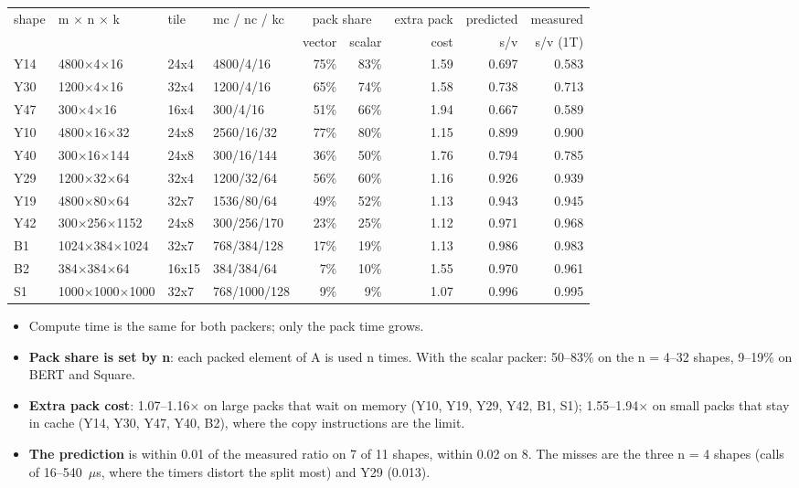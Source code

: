 \begin{center}\small
\begin{tabular}{@{}l l l l rr r rr@{}}
\toprule
shape & m $\times$ n $\times$ k & tile & mc / nc / kc & \multicolumn{2}{c}{pack share} & extra pack & predicted & measured \\
 & & & & vector & scalar & cost & s/v & s/v (1T) \\
\midrule
Y14 & 4800$\times$4$\times$16 & 24x4 & 4800/4/16 & 75\% & 83\% & 1.59 & 0.697 & 0.583 \\
Y30 & 1200$\times$4$\times$16 & 32x4 & 1200/4/16 & 65\% & 74\% & 1.58 & 0.738 & 0.713 \\
Y47 & 300$\times$4$\times$16 & 16x4 & 300/4/16 & 51\% & 66\% & 1.94 & 0.667 & 0.589 \\
Y10 & 4800$\times$16$\times$32 & 24x8 & 2560/16/32 & 77\% & 80\% & 1.15 & 0.899 & 0.900 \\
Y40 & 300$\times$16$\times$144 & 24x8 & 300/16/144 & 36\% & 50\% & 1.76 & 0.794 & 0.785 \\
Y29 & 1200$\times$32$\times$64 & 32x4 & 1200/32/64 & 56\% & 60\% & 1.16 & 0.926 & 0.939 \\
Y19 & 4800$\times$80$\times$64 & 32x7 & 1536/80/64 & 49\% & 52\% & 1.13 & 0.943 & 0.945 \\
Y42 & 300$\times$256$\times$1152 & 24x8 & 300/256/170 & 23\% & 25\% & 1.12 & 0.971 & 0.968 \\
B1 & 1024$\times$384$\times$1024 & 32x7 & 768/384/128 & 17\% & 19\% & 1.13 & 0.986 & 0.983 \\
B2 & 384$\times$384$\times$64 & 16x15 & 384/384/64 & 7\% & 10\% & 1.55 & 0.970 & 0.961 \\
S1 & 1000$\times$1000$\times$1000 & 32x7 & 768/1000/128 & 9\% & 9\% & 1.07 & 0.996 & 0.995 \\
\bottomrule
\end{tabular}
\end{center}
\begin{itemize}\setlength\itemsep{1pt}
\item Compute time is the same for both packers; only the pack time grows.
\item \textbf{Pack share is set by n}: each packed element of A is used n times. With the scalar packer: 50--83\% on the n = 4--32 shapes, 9--19\% on BERT and Square.
\item \textbf{Extra pack cost}: 1.07--1.16$\times$ on large packs that wait on memory (Y10, Y19, Y29, Y42, B1, S1); 1.55--1.94$\times$ on small packs that stay in cache (Y14, Y30, Y47, Y40, B2), where the copy instructions are the limit.
\item \textbf{The prediction} is within 0.01 of the measured ratio on 7 of 11 shapes, within 0.02 on 8. The misses are the three n = 4 shapes (calls of 16--540~$\mu$s, where the timers distort the split most) and Y29 (0.013).
\end{itemize}

